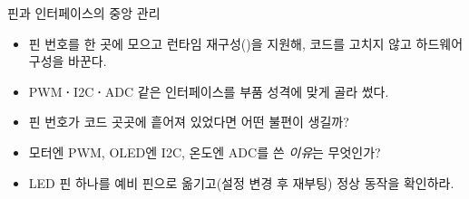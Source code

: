 \begin{teachbox}{핀과 인터페이스의 중앙 관리}
\begin{itemize}
  \item 핀 번호를  한 곳에 모으고 런타임 재구성()을 지원해, 코드를 고치지 않고 하드웨어 구성을 바꾼다.
  \item PWM\textbf{·}I2C\textbf{·}ADC 같은 인터페이스를 부품 성격에 맞게 골라 썼다.
\end{itemize}
\begin{itemize}
  \item 핀 번호가 코드 곳곳에 흩어져 있었다면 어떤 불편이 생길까?
  \item 모터엔 PWM, OLED엔 I2C, 온도엔 ADC를 쓴 \emph{이유}는 무엇인가?
\end{itemize}
\begin{itemize}
  \item LED 핀 하나를 예비 핀으로 옮기고(설정 변경 후 재부팅) 정상 동작을 확인하라.
\end{itemize}
\end{teachbox}

